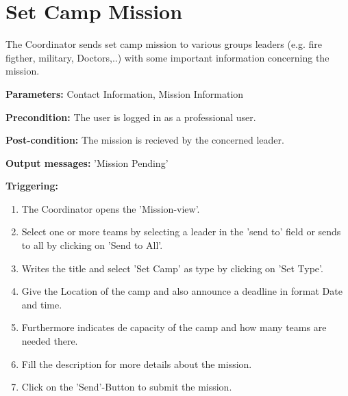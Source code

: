 \section{Set Camp Mission}
\label{operation:SetCampMission}
The Coordinator sends set camp mission to various groups leaders (e.g. fire
figther, military, Doctors,..) with some important information concerning the
mission.\\
\begin{description}
\item \textbf{Parameters:} Contact Information, Mission Information
\item \textbf{Precondition:} The user is logged in as a professional user.
\item \textbf{Post-condition:} The mission is recieved by the concerned leader.
\item \textbf{Output messages:} 'Mission Pending'
\item \textbf{Triggering:}
\begin{enumerate}
\item The Coordinator opens the 'Mission-view'.
\item Select one or more teams by selecting a leader in the 'send to' field or
sends to all by clicking on 'Send to All'.
\item Writes the title and select 'Set Camp' as type by clicking on 'Set
Type'.
\item Give the Location of the camp and also announce a deadline in format Date
and time.
\item Furthermore indicates de capacity of the camp and how many teams are
needed there.
\item Fill the description for more details about the mission.
\item Click on the 'Send'-Button to submit the mission.
\end{enumerate}
\end{description}

